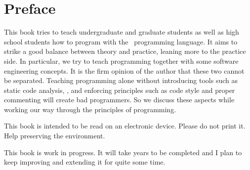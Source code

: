 \chapter*{Preface}%
%
%
This book tries to teach undergraduate and graduate students as well as high school students how to program with the \python\ programming language.
It aims to strike a good balance between theory and practice, leaning more to the practice side.
In particular, we try to teach programming together with some software engineering concepts.
It is the firm opinion of the author that these two cannot be separated.
Teaching programming alone without introducing tools such as static code analysis, , and enforcing principles such as code style and proper commenting will create bad programmers.
So we discuss these aspects while working our way through the principles of programming.

This book is intended to be read on an electronic device.
Please do not print it.
Help preserving the environment.

This book is work in progress.
It will take years to be completed and I plan to keep improving and extending it for quite some time.

